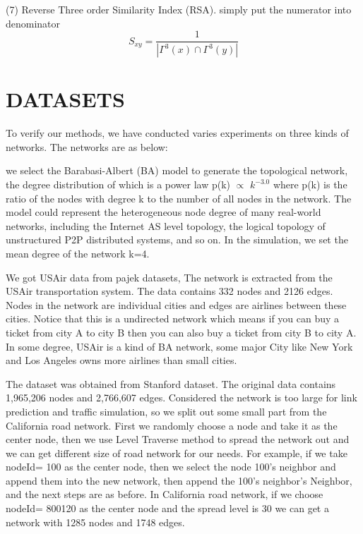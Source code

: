 \documentclass[onecolumn,preprintnumbers,amsmath,amssymb]{revtex4}
\begin{document}
(7) Reverse Three order Similarity Index (RSA). simply put the numerator into denominator
\begin{equation}
S_{xy}=\frac{1}{ |\Gamma^3(x) \cap \Gamma^3(y)|}
\end{equation}




\section*{DATASETS\protect}
To verify our methods, we have conducted varies experiments on three kinds of networks. The networks are as below:


we select the Barabasi-Albert (BA)\cite{BA} model to generate the topological network, the degree distribution of which is a power law p(k) $\propto$ $k^{-3.0}$ where p(k) is the ratio of the nodes with degree k to the number of all nodes in the network. The model could represent the heterogeneous node degree of many real-world networks, including the Internet AS level topology, the logical topology of unstructured P2P distributed systems, and so on. In the simulation, we set the mean degree of the network k=4.


We got USAir data from pajek datasets, The network is extracted from the USAir transportation system. The data contains 332 nodes and 2126 edges. Nodes in the network are individual cities and edges are airlines between these cities. Notice that this is a undirected network which means if you can buy a ticket from city A to city B then you can also buy a ticket from city B to city A. In some degree, USAir is a kind of BA network, some major City like New York and Los Angeles owns more airlines than small cities.


The dataset was obtained from Stanford dataset. The original data contains 1,965,206 nodes and 2,766,607 edges. Considered the network is too large for link prediction and traffic simulation, so we split out some small part from the California road network. First we randomly choose a node and take it as the center node, then we use Level Traverse method to spread the network out and we can get different size of road network for our needs. For example, if we take nodeId= 100 as the center node, then we select the node 100’s neighbor and append them into the new network, then append the 100’s neighbor’s Neighbor, and the next steps are as before. In California road network, if we choose nodeId= 800120 as the center node and the spread level is 30 we can get a network with 1285 nodes and 1748 edges.
\end{document}
